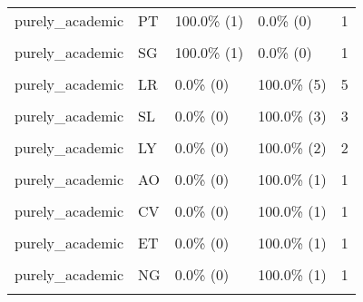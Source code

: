 \documentclass[
]{article}
\begin{document}
\begin{longtable}[t]{llllr}
purely\_academic & PT & 100.0\%   (1) & 0.0\%  (0) & 1\\
\cellcolor{gray!6}{purely\_academic} & \cellcolor{gray!6}{SE} & \cellcolor{gray!6}{100.0\%   (1)} & \cellcolor{gray!6}{0.0\%  (0)} & \cellcolor{gray!6}{1}\\
purely\_academic & SG & 100.0\%   (1) & 0.0\%  (0) & 1\\
\addlinespace
\cellcolor{gray!6}{purely\_academic} & \cellcolor{gray!6}{TZ} & \cellcolor{gray!6}{100.0\%   (1)} & \cellcolor{gray!6}{0.0\%  (0)} & \cellcolor{gray!6}{1}\\
purely\_academic & LR & 0.0\%   (0) & 100.0\%  (5) & 5\\
\cellcolor{gray!6}{purely\_academic} & \cellcolor{gray!6}{HT} & \cellcolor{gray!6}{0.0\%   (0)} & \cellcolor{gray!6}{100.0\%  (3)} & \cellcolor{gray!6}{3}\\
purely\_academic & SL & 0.0\%   (0) & 100.0\%  (3) & 3\\
\cellcolor{gray!6}{purely\_academic} & \cellcolor{gray!6}{GN} & \cellcolor{gray!6}{0.0\%   (0)} & \cellcolor{gray!6}{100.0\%  (2)} & \cellcolor{gray!6}{2}\\
\addlinespace
purely\_academic & LY & 0.0\%   (0) & 100.0\%  (2) & 2\\
\cellcolor{gray!6}{purely\_academic} & \cellcolor{gray!6}{ZW} & \cellcolor{gray!6}{0.0\%   (0)} & \cellcolor{gray!6}{100.0\%  (2)} & \cellcolor{gray!6}{2}\\
purely\_academic & AO & 0.0\%   (0) & 100.0\%  (1) & 1\\
\cellcolor{gray!6}{purely\_academic} & \cellcolor{gray!6}{CD} & \cellcolor{gray!6}{0.0\%   (0)} & \cellcolor{gray!6}{100.0\%  (1)} & \cellcolor{gray!6}{1}\\
purely\_academic & CV & 0.0\%   (0) & 100.0\%  (1) & 1\\
\addlinespace
\cellcolor{gray!6}{purely\_academic} & \cellcolor{gray!6}{DK} & \cellcolor{gray!6}{0.0\%   (0)} & \cellcolor{gray!6}{100.0\%  (1)} & \cellcolor{gray!6}{1}\\
purely\_academic & ET & 0.0\%   (0) & 100.0\%  (1) & 1\\
\cellcolor{gray!6}{purely\_academic} & \cellcolor{gray!6}{FO} & \cellcolor{gray!6}{0.0\%   (0)} & \cellcolor{gray!6}{100.0\%  (1)} & \cellcolor{gray!6}{1}\\
purely\_academic & NG & 0.0\%   (0) & 100.0\%  (1) & 1\\
\cellcolor{gray!6}{purely\_academic} & \cellcolor{gray!6}{SD} & \cellcolor{gray!6}{0.0\%   (0)} & \cellcolor{gray!6}{100.0\%  (1)} & \cellcolor{gray!6}{1}\\

\end{longtable}
\end{document}

